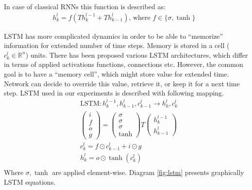 \documentclass{article}
\begin{document}
In case of classical RNNs this function is described as: 
\begin{align*}
  h^l_k = f(Th^{l-1}_k + Th^l_{k-1}) \text{, where $f \in \{\sigma, \tanh\}$ }
\end{align*}

LSTM has more complicated dynamics in order to be able to 
``memorize'' information for extended number of time steps. 
Memory is stored in a cell ($c^l_k \in \mathbb{R}^n$) units. 
There has been proposed various LSTM architectures, which differ in terms
of applied activations functions, connections etc. However, the common
goal is to have a ``memory cell'', which might store value for extended time.
Network can decide to override this value, retrieve it, or keep it for a next time step.
LSTM used in our experiments is described with following mapping.
\begin{align*}
&\text{LSTM} : h^{l-1}_k, h^l_{k-1}, c^l_{k - 1} \rightarrow h^l_k, c^l_k\\
&\begin{pmatrix}i\\f\\o\\g\end{pmatrix} =
  \begin{pmatrix}\sigma\\\sigma\\\sigma\\\tanh\end{pmatrix}
  T\begin{pmatrix}h^{l - 1}_k\\h^l_{k-1}\end{pmatrix}\\
&c^l_k = f \odot c^l_{k-1} + i \odot g\\
&h^l_k = o \odot \tanh(c^l_k)\\
\end{align*}
Where $\sigma, \tanh$ are applied element-wise. Diagram \ref{fig:lstm} presents graphically
LSTM equations.
\end{document}
